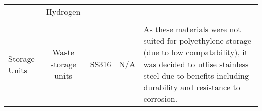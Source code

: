 \begin{table}[H]
\begin{tabular}{@{}lcccl@{}}
                                                      & Hydrogen                                                 &                                                                                               &                                                    &                                                                                                                                                                                                                                                                                                                                                                                                                                                                                                                                                                                                                                                                                                                                                                                                                                                                                                                                                     \\
                                                      &                                                          &                                                                                               &                                                    &                                                                                                                                                                                                                                                                                                                                                                                                                                                                                                                                                                                                                                                                                                                                                                                                                                                                                                                                                     \\
\multirow{-10}{*}{Storage Units}                      & \multirow{-2}{*}{Waste storage units}                    & \multirow{-5}{*}{SS316}                                                                       & \multirow{-5}{*}{N/A}                              & \multirow{-5}{*}{As these materials were not suited for   polyethylene storage (due to low compatability), it was decided to utlise   stainless steel due to benefits including durability and resistance to   corrosion.}                                                                                                                                                             \\

\end{tabular}
\end{table}
